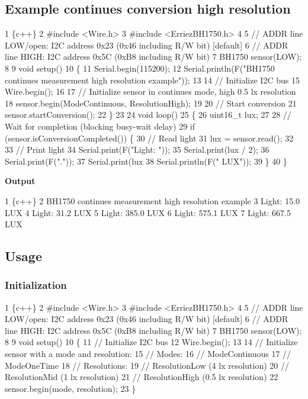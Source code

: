 \subsection*{Example continues conversion high resolution}


\begin{DoxyCode}
1 \{c++\}
2 #include <Wire.h>
3 #include <ErriezBH1750.h>
4 
5 // ADDR line LOW/open:  I2C address 0x23 (0x46 including R/W bit) [default]
6 // ADDR line HIGH:      I2C address 0x5C (0xB8 including R/W bit)
7 BH1750 sensor(LOW);
8 
9 void setup()
10 \{
11   Serial.begin(115200);
12   Serial.println(F("BH1750 continues measurement high resolution example"));
13 
14   // Initialize I2C bus
15   Wire.begin();
16 
17   // Initialize sensor in continues mode, high 0.5 lx resolution
18   sensor.begin(ModeContinuous, ResolutionHigh);
19 
20   // Start conversion
21   sensor.startConversion();
22 \}
23 
24 void loop()
25 \{
26   uint16\_t lux;
27 
28   // Wait for completion (blocking busy-wait delay)
29   if (sensor.isConversionCompleted()) \{
30     // Read light
31     lux = sensor.read();
32 
33     // Print light
34     Serial.print(F("Light: "));
35     Serial.print(lux / 2);
36     Serial.print(F("."));
37     Serial.print(lux %
38     Serial.println(F(" LUX"));
39   \}
40 \}
\end{DoxyCode}
 {\bfseries Output} 
\begin{DoxyCode}
1 \{c++\}
2 BH1750 continues measurement high resolution example
3 Light: 15.0 LUX
4 Light: 31.2 LUX
5 Light: 385.0 LUX
6 Light: 575.1 LUX
7 Light: 667.5 LUX
\end{DoxyCode}


\subsection*{Usage}

\subsubsection*{Initialization}


\begin{DoxyCode}
1 \{c++\}
2 #include <Wire.h>
3 #include <ErriezBH1750.h>
4 
5 // ADDR line LOW/open:  I2C address 0x23 (0x46 including R/W bit) [default]
6 // ADDR line HIGH:      I2C address 0x5C (0xB8 including R/W bit)
7 BH1750 sensor(LOW);
8 
9 void setup()
10 \{
11     // Initialize I2C bus
12     Wire.begin();
13 
14     // Initialize sensor with a mode and resolution:
15     //   Modes:
16     //     ModeContinuous
17     //     ModeOneTime
18     //   Resolutions:
19     //     ResolutionLow (4 lx resolution)
20     //     ResolutionMid (1 lx resolution)
21     //     ResolutionHigh (0.5 lx resolution)
22     sensor.begin(mode, resolution);
23 \}
\end{DoxyCode}



